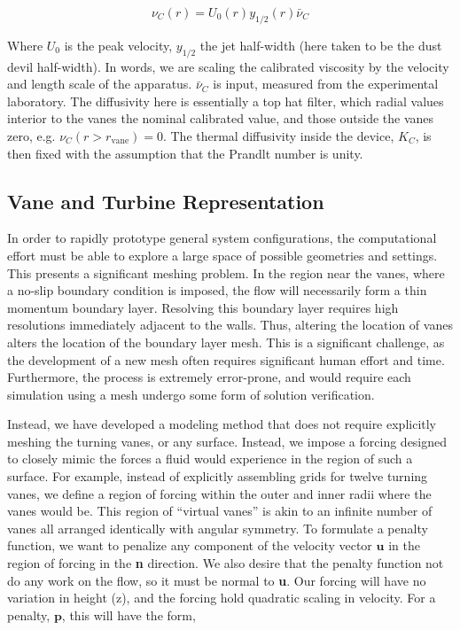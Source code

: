 \begin{equation}
 \nu_C(r) = U_0(r) y_{1/2}(r) \bar \nu_C
\end{equation}

Where $U_0$ is the peak velocity, $y_{1/2}$ the jet half-width (here
taken to be the dust devil half-width). In words, we are scaling the
calibrated viscosity by the velocity and length scale of the
apparatus. $\bar \nu_C $ is input, measured from the experimental
laboratory.  The diffusivity here is essentially a top hat filter, which
radial values interior to the vanes the nominal calibrated value, and
those outside the vanes zero, e.g. $\nu_C(r>r_{\text{vane}})=0$. The
thermal diffusivity inside the device, $K_C$, is then fixed with the
assumption that the Prandlt number is unity.  

\subsection{Vane and Turbine Representation}

In order to rapidly prototype general system configurations, the
computational effort must be able to explore a large space of possible
geometries and settings. This presents a significant meshing
problem. In the region near the vanes, where a no-slip boundary
condition is imposed, the flow will necessarily form a thin momentum
boundary layer. Resolving this boundary layer requires high resolutions
immediately adjacent to the walls. Thus, altering the location of vanes
alters the location of the boundary layer mesh. This is a significant
challenge, as the development of a new mesh often requires significant
human effort and time. Furthermore, the process is extremely
error-prone, and would require each simulation using a mesh undergo
some form of solution verification. 

Instead, we have developed a modeling method that does not require
explicitly meshing the turning vanes, or any surface. Instead, we impose
a forcing designed to closely mimic the forces a fluid would experience
in the region of such a surface. For example, instead of explicitly
assembling grids for twelve turning vanes, we define a region of forcing
within the 
outer and inner radii where the vanes would be. This region of ``virtual
vanes'' is akin to an infinite number of vanes all arranged identically
with angular symmetry. To formulate a penalty function, we want to
penalize any component of the velocity vector $\textbf{u}$ in the region
of forcing in the \textbf{n} direction. We also desire that the penalty
function not do any work on the flow, so it must be normal to
\textbf{u}. Our forcing will have no variation in height (z), and the
forcing hold quadratic scaling in velocity. For a penalty,
$\textbf{p}$, this will have the form,   

